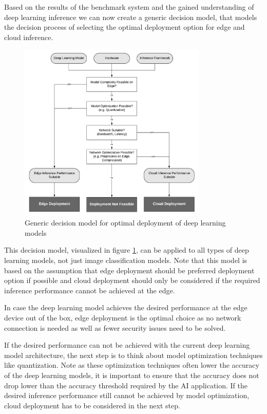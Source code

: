 Based on the results of the benchmark system and the gained understanding of deep learning inference we can now create a generic decision model, that models the decision process of selecting the optimal deployment option for edge and cloud inference.

\begin{figure}[!htb]
\centering
\includegraphics[width=0.8\textwidth]{./Bilder/DecisionModel.pdf}
\caption{Generic decision model for optimal deployment of deep learning models}
\label{fig:DecisionModel}
\end{figure}


This decision model, visualized in figure \ref{fig:DecisionModel}, can be applied to all types of deep learning models, not just image classification models.
Note that this model is based on the assumption that edge deployment should be preferred deployment option if possible and cloud deployment should only be considered if the required inference performance cannot be achieved at the edge.


In case  the deep learning model achieves the desired performance at the edge device out of the box, edge deployment is the optimal choice as no network connection is needed as well as fewer security issues need to be solved.

If the desired performance can not be achieved with the current deep learning model architecture, the next step is to think about model optimization techniques like quantization.
Note as these optimization techniques often lower the accuracy of the deep learning models, it is important to ensure that the accuracy does not drop lower than the accuracy threshold required by the AI application.
If the desired inference performance still cannot be achieved by model optimization, cloud deployment has to be considered in the next step.

